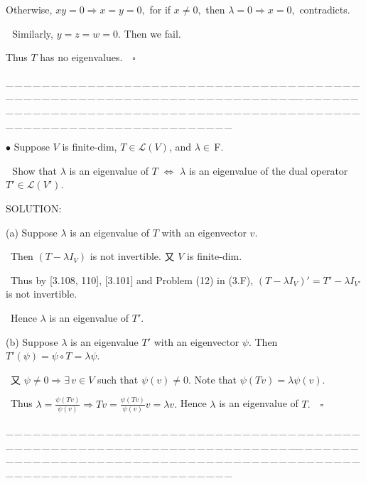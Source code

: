 \documentclass[a4paper, 11pt, UTF8]{article}
\def\Lm{\mathcal{L}}
\def\Fbfc{$\,{\timesbf F}$}
\begin{document}
\begin{large}
Otherwise, $xy=0\Rightarrow x=y=0,$ for if $x\neq 0,$ then $\lambda=0\Rightarrow x=0,$ contradicts.\par\qquad\qquad\quad\,\, Similarly, $y=z=w=0.$ Then we fail.\par\quad
Thus $T$ has no eigenvalues.$\quad\square$\par
{\tiny \_\,\_\,\_\,\_\,\_\,\_\,\_\,\_\,\_\,\_\,\_\,\_\,\_\,\_\,\_\,\_\,\_\,\_\,\_\,\_\,\_\,\_\,\_\,\_\,\_\,\_\,\_\,\_\,\_\,\_\,\_\,\_\,\_\,\_\,\_\,\_\,\_\,\_\,\_\,\_\,\_\,\_\,\_\,\_\,\_\,\_\,\_\,\_\,\_\,\_\,\_\,\_\,\_\,\_\,\_\,\_\,\_\,\_\,\_\,\_\,\_\,\_\,\_\,\_\,\_\,\_\,\_\,\_\,\_\,\_\,\_\_\,\_\,\_\,\_\,\_\,\_\,\_\,\_\,\_\,\_\,\_\,\_\,\_\,\_\,\_\,\_\,\_\,\_\,\_\,\_\,\_\,\_\,\_\,\_\,\_\,\_\,\_\,\_\,\_\,\_\,\_\,\_\,\_\,\_\,\_\,\_\,\_\,\_\,\_\,\_\,\_\,\_\,\_\,\_\,\_\,\_\,\_\,\_\,\_\,\_\,\_\,\_\,\_\,\_\,\_\,\_\,\_\,\_\,\_\,\_\,\_\,\_\,\_\,\_\,\_\,\_\,\_\,\_\,\_\,\_\,\_}\par

{\small $\bullet$} {\timessl\Large
Suppose $V$ is finite-dim, $T\in\Lm(V)$, and $\lambda\in\Fbfc.$
}\par\,\,
{\timessl\Large Show that $\lambda$ is an eigenvalue of $T$ $\Longleftrightarrow$ $\lambda$ is an eigenvalue of the dual operator $T'\in\Lm(V')$. 
}\par
{\timesbf S\footnotesize{OLUTION:}}\par\quad
(a) Suppose $\lambda$ is an eigenvalue of $T$ with an eigenvector $v$.\par\qquad\,
Then $(T-\lambda I_V)$ is not invertible. 又 $V$ is finite-dim.\par\qquad\,
Thus by [3.108, 110], [3.101] and Problem (12) in (3.F), $(T-\lambda I_V)'=T'-\lambda I_{V'}$ is not invertible.\par\qquad\,
Hence $\lambda$ is an eigenvalue of $T'.$\par\quad
(b) Suppose $\lambda$ is an eigenvalue $T'$ with an eigenvector $\psi.$ Then $T'(\psi)=\psi\circ T=\lambda\psi.$\par\qquad\,
又 $\psi\neq 0\Rightarrow\exists\,v\in V$ such that $\psi(v)\neq 0.$ Note that $\psi(Tv)=\lambda\psi(v).$\par\qquad\,
Thus $\lambda=\displaystyle\frac{\psi(Tv)}{\psi(v)}\Rightarrow Tv=\frac{\psi(Tv)}{\psi(v)}v=\lambda v.$
Hence $\lambda$ is an eigenvalue of $T.\quad\square$\par
{\tiny \_\,\_\,\_\,\_\,\_\,\_\,\_\,\_\,\_\,\_\,\_\,\_\,\_\,\_\,\_\,\_\,\_\,\_\,\_\,\_\,\_\,\_\,\_\,\_\,\_\,\_\,\_\,\_\,\_\,\_\,\_\,\_\,\_\,\_\,\_\,\_\,\_\,\_\,\_\,\_\,\_\,\_\,\_\,\_\,\_\,\_\,\_\,\_\,\_\,\_\,\_\,\_\,\_\,\_\,\_\,\_\,\_\,\_\,\_\,\_\,\_\,\_\,\_\,\_\,\_\,\_\,\_\,\_\,\_\,\_\,\_\_\,\_\,\_\,\_\,\_\,\_\,\_\,\_\,\_\,\_\,\_\,\_\,\_\,\_\,\_\,\_\,\_\,\_\,\_\,\_\,\_\,\_\,\_\,\_\,\_\,\_\,\_\,\_\,\_\,\_\,\_\,\_\,\_\,\_\,\_\,\_\,\_\,\_\,\_\,\_\,\_\,\_\,\_\,\_\,\_\,\_\,\_\,\_\,\_\,\_\,\_\,\_\,\_\,\_\,\_\,\_\,\_\,\_\,\_\,\_\,\_\,\_\,\_\,\_\,\_\,\_\,\_\,\_\,\_\,\_\,\_}{\tiny\,\par}


\end{large}
\end{document}
